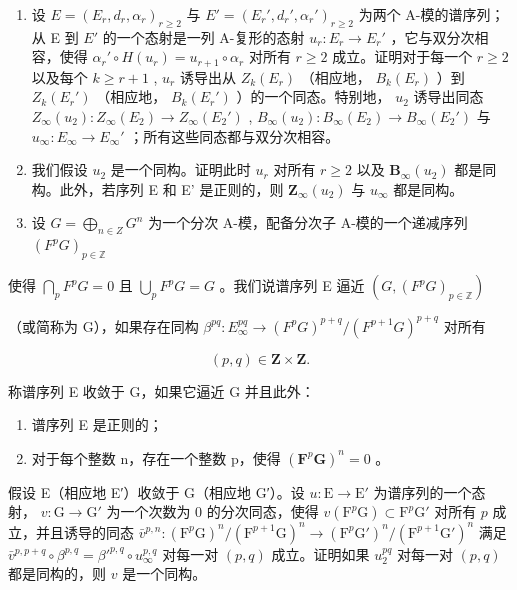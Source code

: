 \begin{enumerate}
\def\labelenumi{\alph{enumi})}
\setcounter{enumi}{1}
\item
  设 \(E = (E_r, d_r, \alpha_r)_{r \geqslant 2}\) 与 \(E' = (E_r', d_r', \alpha_r')_{r \geqslant 2}\) 为两个 A-模的谱序列；从 E 到 \(E'\) 的一个态射是一列 A-复形的态射 \(u_r : E_r \to E_r'\) ，它与双分次相容，使得 \(\alpha_r' \circ H(u_r) = u_{r+1} \circ \alpha_r\) 对所有 \(r \geqslant 2\) 成立。证明对于每一个 \(r \geqslant 2\) 以及每个 \(k \geqslant r + 1\) , \(u_r\) 诱导出从 \(Z_k(E_r)\) （相应地， \(B_k(E_r)\) ）到 \(Z_k(E_r')\) （相应地， \(B_k(E_r')\) ）的一个同态。特别地， \(u_2\) 诱导出同态 \(Z_\infty(u_2) : Z_\infty(E_2) \to Z_\infty(E_2')\) , \(B_\infty(u_2) : B_\infty(E_2) \to B_\infty(E_2')\) 与 \(u_\infty : E_\infty \to E_\infty'\) ；所有这些同态都与双分次相容。
\item
  我们假设 \(u_2\) 是一个同构。证明此时 \(u_r\) 对所有 \(r \geqslant 2\) 以及 \(\mathbf{B}_{\infty}(u_2)\) 都是同构。此外，若序列 E 和 E' 是正则的，则 \(\mathbf{Z}_{\infty}(u_2)\) 与 \(u_{\infty}\) 都是同构。
\item
  设 \(G = \bigoplus_{n \in Z} G^n\) 为一个分次 A-模，配备分次子 A-模的一个递减序列 \((F^p G)_{p \in \mathbb{Z}}\)
\end{enumerate}

使得 \(\bigcap_{p} F^{p} G = 0\) 且 \(\bigcup_{p} F^{p} G = G\) 。我们说谱序列 E 逼近 \((G, (F^{p} G)_{p \in \mathbb{Z}})\)

（或简称为 G），如果存在同构 \(\beta^{pq}: E_{\infty}^{pq} \to (F^p G)^{p+q}/(F^{p+1} G)^{p+q}\) 对所有

\[
(p, q) \in \mathbf {Z} \times \mathbf {Z}.
\]

称谱序列 E 收敛于 G，如果它逼近 G 并且此外：

\begin{enumerate}
\def\labelenumi{(\roman{enumi})}
\item
  谱序列 E 是正则的；
\item
  对于每个整数 n，存在一个整数 p，使得 \((\mathbf{F}^{p}\mathbf{G})^{n}=0\) 。
\end{enumerate}

假设 E（相应地 E′）收敛于 G（相应地 G′）。设 \(u: \mathrm{E} \to \mathrm{E}'\) 为谱序列的一个态射， \(v: \mathrm{G} \to \mathrm{G}'\) 为一个次数为 0 的分次同态，使得 \(v(\mathrm{F}^p \mathrm{G}) \subset \mathrm{F}^p \mathrm{G}'\) 对所有 \(p\) 成立，并且诱导的同态 \(\bar{v}^{p,n}: (\mathrm{F}^p \mathrm{G})^n / (\mathrm{F}^{p+1} \mathrm{G})^n \to (\mathrm{F}^p \mathrm{G}')^n / (\mathrm{F}^{p+1} \mathrm{G}')^n\) 满足 \(\bar{v}^{p,p+q} \circ \beta^{p,q} = \beta'^{p,q} \circ u_{\infty}^{p,q}\) 对每一对 \((p, q)\) 成立。证明如果 \(u_2^{pq}\) 对每一对 \((p, q)\) 都是同构的，则 \(v\) 是一个同构。

